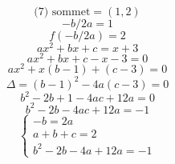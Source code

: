 \documentclass{article}
\begin{document}
\[ \text{(7) sommet} = (1,2) \]
\[ -b/2a = 1 \]
\[ f(-b/2a) = 2 \]
\[ ax^2 + bx + c = x + 3 \]
\[ ax^2 + bx + c - x - 3 = 0 \]
\[ ax^2 + x(b-1) + (c-3) = 0 \]
\[ \Delta = (b-1)^2 - 4a(c-3) = 0 \]
\[ b^2 - 2b + 1 - 4ac + 12a = 0 \]
\[ b^2 - 2b - 4ac + 12a = -1 \]
\[ \begin{cases} -b = 2a \\ a + b + c = 2 \\ b^2 - 2b - 4a + 12a = -1 \end{cases} \]
\end{document}
